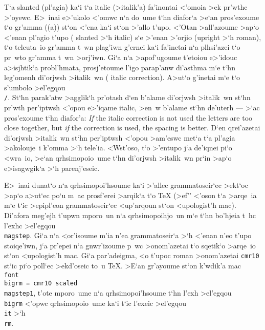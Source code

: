 T`a {\rm slanted} (pl'agia) ka`i t`a {\rm italic} (>italik'a) fa'inontai
<'omoia >ek pr'wthc >'oyewc.  E>~inai e>'ukolo <'omwc n`a do~ume t`hn
diafor`a >e`an pros'exoume t`o gr'amma (({\rm a})) st`on <'ena ka`i
st`on >'allo t'upo. <'Otan >all'azoume >ap`o <'enan pl'agio t'upo ({\rm
slanted} >`h {\rm italic}) s`e >'enan >'orjio ({\rm upright} >`h {\rm
roman}), t`o teleuta~io gr'amma t~wn plag'iwn g'ernei ka`i fa'inetai n`a
plhsi'azei t`o pr~wto gr'amma t~wn >orj'iwn.  Gi`a n`a >apof'ugoume
t'etoiou e>'idouc a>isjhtik`a probl'hmata, prosj'etoume l'igo parap'anw
di'asthma m`e t`hn leg'omenh {\tengs di'orjwsh >italik~wn\/} ({\rm
italic correction}). A>ut`o g'inetai m`e t`o s'umbolo >el'egqou {\tt
\\/}.%
\toindex{/}
St`hn parak'atw >agglik`h pr'otash d`en b'alame di'orjwsh >italik~wn
st`hn pr'wth per'iptwsh <'opou e>'iqame {\rm italic}, >en~w b'alame     
st`hn de'uterh --- >`ac pros'exoume t`hn diafor'a: {\rm {\it If} the
italic correction is not used the letters are too close together, but
{\it if\/} the correction is used, the spacing is better.}  D`en       
qrei'azetai di'orjwsh >italik~wn st`hn per'iptwsh <'opou >am'e\-swc
met`a t`a pl'agia >akolouje~i k'omma >`h tele'ia.  <Wst'oso, t`o      
>'entupo j`a de'iqnei pi`o <wra~io, >e`an qrhsimopoio~ume t`hn di'orjwsh
>italik~wn pr`in >ap`o e>isagwgik`a >`h parenj'eseic.

E>~inai dunat`o n`a qrhsimopoi'hsoume ka`i >'allec grammatoseir`ec
>ekt`oc >ap`o a>ut`ec po`u m~ac prosf'erei >arqik`a t`o {\rm \TeX}
(>ef'' <'oson t`a >arqe~ia m`e t`ic >epipl'eon grammatoseir`ec
<up'arqoun st`on <upologist'h mac). Di'afora meg'ejh t'upwn mporo~un n`a
qrhsimopoihjo~un m`e t`hn bo'hjeia t~hc l'exhc >el'egqou {\tt
\\magstep}.  Gi`a n`a <or'isoume m'ia n'ea grammatoseir`a >`h <'enan
n'eo t'upo stoiqe'iwn, j`a pr'epei n`a gnwr'izoume p~wc >onom'azetai t`o
sqetik`o >arqe~io st`on <upologist'h mac. Gi`a par'adeigma, <o t'upoc
{\rm roman} >onom'azetai {\tt cmr10} st`ic pi`o poll`ec >ekd'oseic to~u
{\rm \TeX}\null.  >E`an gr'ayoume st`on k'wdik'a mac {\tt \\font\\bigrm
= cmr10 scaled \\magstep\NB{}1}, t'o\-te mporo~ume n`a
qrh\-simo\-poi'h\-soume t`hn l'exh >el'egqou {\tt\\bigrm} <'opwc
qrhsimopoio~ume ka`i t`ic l'exeic >el'egqou {\tt\\it} >`h {\tt\\rm}.%

